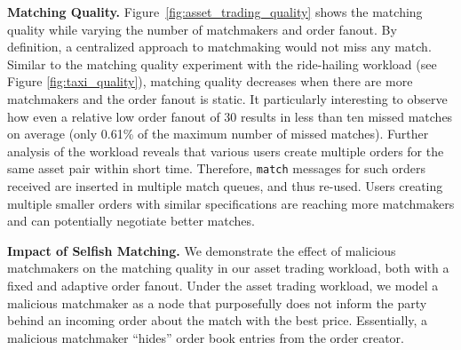 \textbf{Matching Quality.}
Figure~\ref{fig:asset_trading_quality} shows the matching quality while varying the number of matchmakers and order fanout.
By definition, a centralized approach to matchmaking would not miss any match.
Similar to the matching quality experiment with the ride-hailing workload (see Figure \ref{fig:taxi_quality}), matching quality decreases when there are more matchmakers and the order fanout is static.
It particularly interesting to observe how even a relative low order fanout of 30 results in less than ten missed matches on average (only 0.61\% of the maximum number of missed matches).
Further analysis of the workload reveals that various users create multiple orders for the same asset pair within short time.
Therefore, \texttt{match} messages for such orders received are inserted in multiple match queues, and thus re-used.
Users creating multiple smaller orders with similar specifications are reaching more matchmakers and can potentially negotiate better matches.



\textbf{Impact of Selfish Matching.}
We demonstrate the effect of malicious matchmakers on the matching quality in our asset trading workload, both with a fixed and adaptive order fanout.
Under the asset trading workload, we model a malicious matchmaker as a node that purposefully does not inform the party behind an incoming order about the match with the best price.
Essentially, a malicious matchmaker \enquote{hides} order book entries from the order creator.

